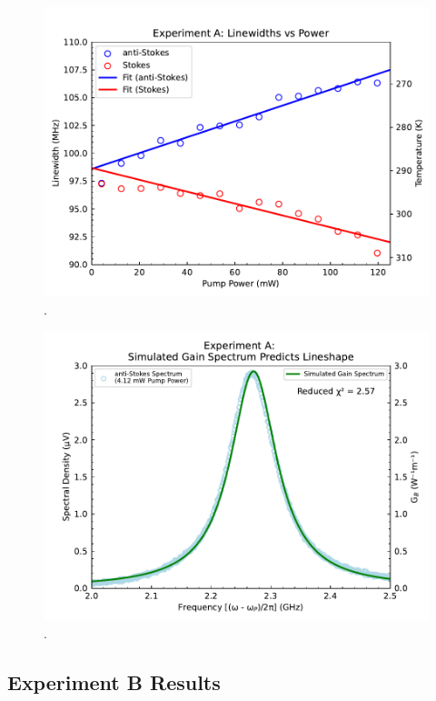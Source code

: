\begin{figure}[t]
  \centering
  \includegraphics[width=\textwidth]{figs/3-Cooling/P-O Linewidths.pdf}
  \caption{.}
  \label{fig:Cooling:P-O Linewidths}
\end{figure}

\begin{figure}[t]
  \centering
  \includegraphics[width=\textwidth]{figs/3-Cooling/P-O Simulated Gain.pdf}
  \caption{.}
  \label{fig:Cooling:P-O Simulated Gain}
\end{figure}


\subsection{Experiment B Results}
\label{Cooling:subsec:ExperimentBResults}

